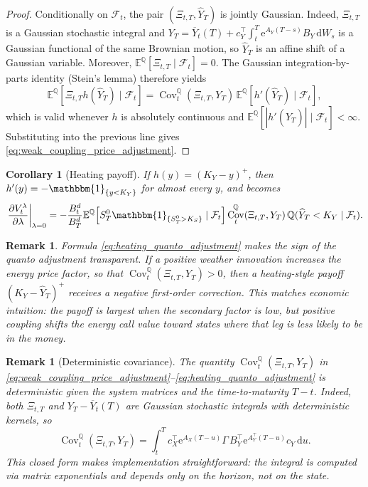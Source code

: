 \documentclass[10pt,reqno]{amsart}
\newtheorem{corollary}[theorem]{Corollary}
\newtheorem{remark}[theorem]{Remark}
\newcommand{\E}{\mathbb{E}}
\newcommand{\Q}{\mathbb{Q}}
\newcommand{\F}{\mathcal{F}}
\newcommand{\1}{\mathbbm{1}}
\newcommand{\dd}{\mathrm{d}}
\newcommand{\ee}{\mathrm{e}}
\DeclareMathOperator{\Cov}{Cov}
\begin{document}
\begin{proof}
Conditionally on $\F_t$, the pair $(\Xi_{t,T},\widehat{Y}_T)$ is jointly
Gaussian.
Indeed, $\Xi_{t,T}$ is a Gaussian stochastic integral and $Y_T =
\overline{Y}_t(T) + c_Y^\top\int_t^T \ee^{A_Y(T-s)} B_Y\,\dd W_s$ is a
Gaussian functional of the same Brownian motion, so $\widehat{Y}_T$ is an
affine shift of a Gaussian variable. Moreover,
$\E^\Q[\Xi_{t,T}\mid\F_t]=0$. The Gaussian integration-by-parts identity
(Stein's lemma) therefore yields
$$
\E^\Q\!\left[\Xi_{t,T} h(\widehat{Y}_T)\mid\F_t\right]
= \Cov_t^\Q(\Xi_{t,T},Y_T)\,
   \E^\Q\!\left[h'(\widehat{Y}_T)\mid\F_t\right],
$$
which is valid whenever $h$ is absolutely continuous and
$\E^\Q[|h'(\widehat{Y}_T)|\mid\F_t]<\infty$. Substituting into the previous line
gives \eqref{eq:weak_coupling_price_adjustment}.
\end{proof}

\begin{corollary}[Heating payoff]
\label{cor:heating_quanto}
If $h(y)=(K_Y-y)^+$, then $h'(y)=-\1_{\{y<K_Y\}}$ for almost every $y$,
and  becomes
\begin{align}
  \left.\frac{\partial V_t^\lambda}{\partial \lambda}\right|_{\lambda=0}
  = - \frac{B_t^d}{B_T^d}
      \E^\Q\!\left[S_T^0 \1_{\{S_T^0>K_S\}}\mid\F_t\right]
      \Cov_t^\Q(\Xi_{t,T},Y_T)\,
      \Q(\widehat{Y}_T<K_Y\mid\F_t).
      \label{eq:heating_quanto_adjustment}
\end{align}
\end{corollary}

\begin{remark}
Formula \eqref{eq:heating_quanto_adjustment} makes the sign of the quanto
adjustment transparent. If a positive weather innovation increases the energy
price factor, so that $\Cov_t^\Q(\Xi_{t,T},Y_T)>0$, then a heating-style
payoff $(K_Y-\widehat{Y}_T)^+$ receives a negative first-order correction. This matches
economic intuition: the payoff is largest when the secondary factor is low, but
positive coupling shifts the energy call value toward states where that leg is
less likely to be in the money.
\end{remark}

\begin{remark}[Deterministic covariance]
The quantity $\Cov_t^\Q(\Xi_{t,T},Y_T)$ in
\eqref{eq:weak_coupling_price_adjustment}--\eqref{eq:heating_quanto_adjustment}
is \emph{deterministic} given the system matrices and the time-to-maturity
$T-t$. Indeed, both $\Xi_{t,T}$ and $Y_T - \overline{Y}_t(T)$ are
Gaussian stochastic integrals with deterministic kernels, so
$$
\Cov_t^\Q(\Xi_{t,T},Y_T)
= \int_t^T c_X^\top \ee^{A_X(T-u)} \Gamma\, B_Y^\top \ee^{A_Y^\top(T-u)} c_Y
  \,\dd u.
$$
This closed form makes implementation straightforward: the integral is
computed via matrix exponentials and depends only on the horizon, not on
the state.
\end{remark}
\end{document}
